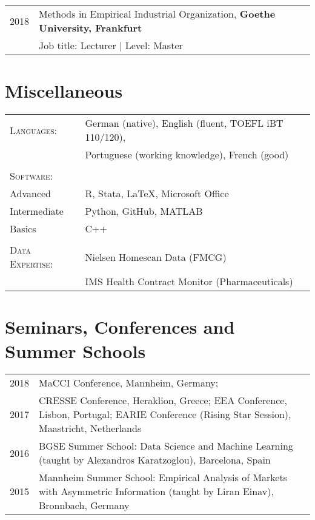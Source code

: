 \documentclass[a4paper,10pt]{article} %
\begin{document}
\begin{tabular}{P{4.5cm} P{10cm}}
\textsc{2018} &  Methods in Empirical Industrial Organization, \textbf{Goethe University, Frankfurt} \\ & \small Job title: Lecturer | Level: Master \\
\end{tabular}




\section{Miscellaneous}

\begin{tabular}{P{4.5cm} P{10cm}}
\textsc{Languages:} &  German (native), English (fluent, TOEFL iBT 110/120), \\
& Portuguese (working knowledge), French (good)\\
\\
\textsc{Software:} &  \\
Advanced &  R, Stata,  \LaTeX, Microsoft Office \\
Intermediate & Python, GitHub, MATLAB \\
Basics & C++ \\
\\
\textsc{Data Expertise:} & Nielsen Homescan Data (FMCG) \\
 & IMS Health Contract Monitor (Pharmaceuticals)\\
\end{tabular}




\section{Seminars, Conferences and Summer Schools}

\begin{tabular}{P{4.5cm} P{10cm}}	
\textsc{2018}  & MaCCI Conference, Mannheim, Germany; 
 \\[0.2cm]
\textsc{2017}  & CRESSE Conference, Heraklion, Greece; 
 EEA Conference, Lisbon, Portugal; EARIE Conference (Rising Star Session), Maastricht, Netherlands
 \\[0.2cm]
\textsc{2016}  & BGSE Summer School: Data Science and Machine Learning
 (taught by Alexandros Karatzoglou), Barcelona, Spain \\[0.2cm]

\textsc{2015}  & Mannheim Summer School: Empirical Analysis of Markets with Asymmetric
Information (taught by Liran Einav), Bronnbach, Germany \\[0.2cm]

\end{tabular}
\end{document}
